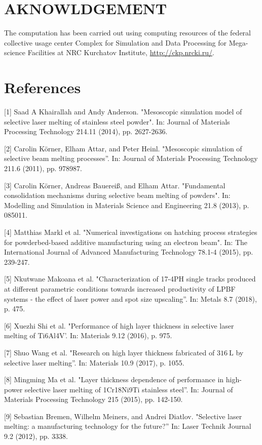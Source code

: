 \documentclass[10pt]{article}
\begin{document}
\section*{AKNOWLDGEMENT}
The computation has been carried out using computing resources of the federal collective usage center Complex for Simulation and Data Processing for Mega-science Facilities at NRC Kurchatov Institute, \href{http://ckp.nrcki.ru/}{http://ckp.nrcki.ru/}.

\section*{References}
[1] Saad A Khairallah and Andy Anderson. "Mesoscopic simulation model of selective laser melting of stainless steel powder". In: Journal of Materials Processing Technology 214.11 (2014), pp. 2627-2636.

[2] Carolin Körner, Elham Attar, and Peter Heinl. "Mesoscopic simulation of selective beam melting processes”. In: Journal of Materials Processing Technology 211.6 (2011), pp. 978987.

[3] Carolin Körner, Andreas Bauereiß, and Elham Attar. "Fundamental consolidation mechanisms during selective beam melting of powders". In: Modelling and Simulation in Materials Science and Engineering 21.8 (2013), p. 085011.

[4] Matthias Markl et al. "Numerical investigations on hatching process strategies for powderbed-based additive manufacturing using an electron beam". In: The International Journal of Advanced Manufacturing Technology 78.1-4 (2015), pp. 239-247.

[5] Nkutwane Makoana et al. "Characterization of 17-4PH single tracks produced at different parametric conditions towards increased productivity of LPBF systems - the effect of laser power and spot size upscaling”. In: Metals 8.7 (2018), p. 475.

[6] Xuezhi Shi et al. "Performance of high layer thickness in selective laser melting of Ti6Al4V'. In: Materials 9.12 (2016), p. 975.

[7] Shuo Wang et al. "Research on high layer thickness fabricated of $316 \mathrm{~L}$ by selective laser melting”. In: Materials 10.9 (2017), p. 1055.

[8] Mingming Ma et al. "Layer thickness dependence of performance in high-power selective laser melting of 1Cr18Ni9Ti stainless steel”. In: Journal of Materials Processing Technology 215 (2015), pp. 142-150.

[9] Sebastian Bremen, Wilhelm Meiners, and Andrei Diatlov. "Selective laser melting: a manufacturing technology for the future?” In: Laser Technik Journal 9.2 (2012), pp. 3338.
\end{document}
